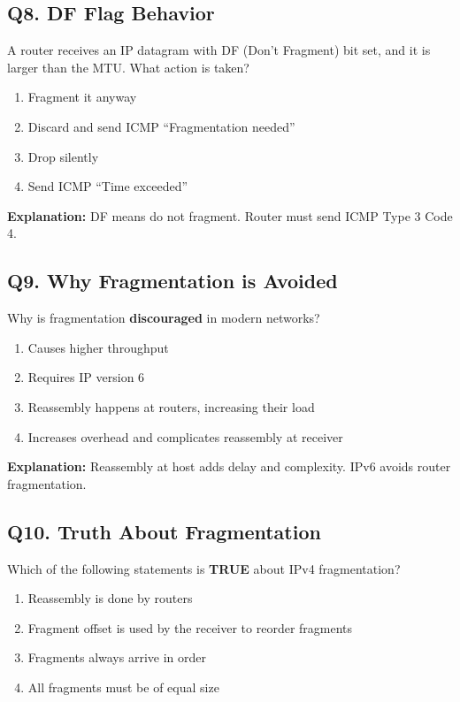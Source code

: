 \subsection*{Q8. DF Flag Behavior}
A router receives an IP datagram with DF (Don't Fragment) bit set, and it is larger than the MTU. What action is taken?

\begin{enumerate}[label=(\alph*)]
    \item Fragment it anyway  
    \item Discard and send ICMP ``Fragmentation needed''  
    \item Drop silently  
    \item Send ICMP ``Time exceeded''  
\end{enumerate}

\textbf{Explanation:} DF means do not fragment. Router must send ICMP Type 3 Code 4.

\vspace{1em}

\subsection*{Q9. Why Fragmentation is Avoided}
Why is fragmentation \textbf{discouraged} in modern networks?

\begin{enumerate}[label=(\alph*)]
    \item Causes higher throughput  
    \item Requires IP version 6  
    \item Reassembly happens at routers, increasing their load  
    \item Increases overhead and complicates reassembly at receiver  
\end{enumerate}

\textbf{Explanation:} Reassembly at host adds delay and complexity. IPv6 avoids router fragmentation.

\vspace{1em}

\subsection*{Q10. Truth About Fragmentation}
Which of the following statements is \textbf{TRUE} about IPv4 fragmentation?

\begin{enumerate}[label=(\alph*)]
    \item Reassembly is done by routers  
    \item Fragment offset is used by the receiver to reorder fragments  
    \item Fragments always arrive in order  
    \item All fragments must be of equal size  
\end{enumerate}

